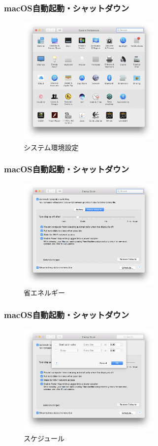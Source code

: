 \documentclass[10pt, dvipdfmx]{beamer}
\begin{document}
        \begin{frame}
            \frametitle{macOS自動起動・シャットダウン}
                \begin{figure}[htb]
                    \includegraphics[width=70mm]{images/auto-1.png}
                    \caption{システム環境設定}
                    \label{fig:01}
                \end{figure}
        \end{frame}

        \begin{frame}
            \frametitle{macOS自動起動・シャットダウン}
                \begin{figure}[htb]
                    \includegraphics[width=70mm]{images/auto-2.png}
                    \caption{省エネルギー}
                    \label{fig:02}
                \end{figure}
        \end{frame}

        \begin{frame}
            \frametitle{macOS自動起動・シャットダウン}
                \begin{figure}[htb]
                    \includegraphics[width=70mm]{images/auto-3.png}
                    \caption{スケジュール}
                    \label{fig:03}
                \end{figure}
        \end{frame}
\end{document}
